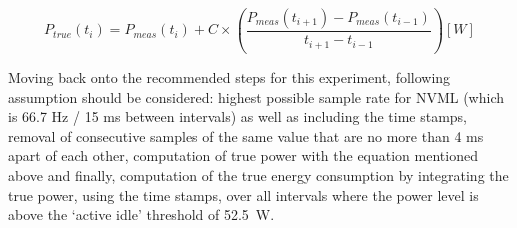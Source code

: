 \begin{equation} \label{eq:Computing the true instant power}
    P_{true} (t_i) = P_{meas} (t_i) + C \times (\frac{P_{meas} (t_{i+1}) - P_{meas} (t_{i-1})}{t_{i+1} - t_{i-1}})  [W]
\end{equation}


Moving back onto the recommended steps for this experiment,
following assumption should be considered: highest possible sample
rate for NVML (which is 66.7 Hz / 15 ms between intervals) as well
as including the time stamps, removal of consecutive samples of
the same value that are no more than 4 ms apart of each other,
computation of true power with the equation mentioned above and
finally, computation of the true energy consumption by integrating
the true power, using the time stamps, over all intervals where
the power level is above the `active idle' threshold of 52.5~W.

